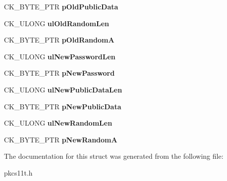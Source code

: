 \begin{DoxyCompactItemize}
C\+K\+\_\+\+B\+Y\+T\+E\+\_\+\+P\+TR {\bfseries p\+Old\+Public\+Data}
\item 
\mbox{\label{struct_c_k___s_k_i_p_j_a_c_k___r_e_l_a_y_x___p_a_r_a_m_s_a6d0c55f85987d89152ae85ec76794377}} 
C\+K\+\_\+\+U\+L\+O\+NG {\bfseries ul\+Old\+Random\+Len}
\item 
\mbox{\label{struct_c_k___s_k_i_p_j_a_c_k___r_e_l_a_y_x___p_a_r_a_m_s_a615eeb160a23cc5663e33f56dc4df40d}} 
C\+K\+\_\+\+B\+Y\+T\+E\+\_\+\+P\+TR {\bfseries p\+Old\+RandomA}
\item 
\mbox{\label{struct_c_k___s_k_i_p_j_a_c_k___r_e_l_a_y_x___p_a_r_a_m_s_adf3080690b07550b8f1b4883edbb2ab6}} 
C\+K\+\_\+\+U\+L\+O\+NG {\bfseries ul\+New\+Password\+Len}
\item 
\mbox{\label{struct_c_k___s_k_i_p_j_a_c_k___r_e_l_a_y_x___p_a_r_a_m_s_a7ebb58594ac729d26b00c4dc7f3a17c6}} 
C\+K\+\_\+\+B\+Y\+T\+E\+\_\+\+P\+TR {\bfseries p\+New\+Password}
\item 
\mbox{\label{struct_c_k___s_k_i_p_j_a_c_k___r_e_l_a_y_x___p_a_r_a_m_s_ae8cf50e7d1ad0f0320761f4657a649ba}} 
C\+K\+\_\+\+U\+L\+O\+NG {\bfseries ul\+New\+Public\+Data\+Len}
\item 
\mbox{\label{struct_c_k___s_k_i_p_j_a_c_k___r_e_l_a_y_x___p_a_r_a_m_s_aa9b447dbf217bfb55fe13f3d0bbc5a45}} 
C\+K\+\_\+\+B\+Y\+T\+E\+\_\+\+P\+TR {\bfseries p\+New\+Public\+Data}
\item 
\mbox{\label{struct_c_k___s_k_i_p_j_a_c_k___r_e_l_a_y_x___p_a_r_a_m_s_a4e7516cf5b540f26f34e456456177a96}} 
C\+K\+\_\+\+U\+L\+O\+NG {\bfseries ul\+New\+Random\+Len}
\item 
\mbox{\label{struct_c_k___s_k_i_p_j_a_c_k___r_e_l_a_y_x___p_a_r_a_m_s_acd5cfdff0433d3c431f883ffdb8d941b}} 
C\+K\+\_\+\+B\+Y\+T\+E\+\_\+\+P\+TR {\bfseries p\+New\+RandomA}
\end{DoxyCompactItemize}


The documentation for this struct was generated from the following file\+:\begin{DoxyCompactItemize}
\item 
pkcs11t.\+h\end{DoxyCompactItemize}
